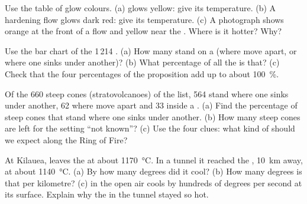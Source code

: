 \begin{exercise}[$\star$]\label{exo:g7:volcanoes:4}
Use the table of glow colours. (a)  glows yellow: give its
temperature. (b) A hardening flow glows dark red: give its temperature.
(c) A photograph shows orange  at the front of a flow and yellow 
near the . Where is it hotter? Why?
\end{exercise}

\begin{exercise}[$\star\star$]\label{exo:g7:volcanoes:5}
Use the bar chart of the 1\,214 . (a) How many  stand on
a  (where  move apart, or where one sinks under
another)? (b) What percentage of all the  is that? (c) Check that
the four percentages of the proposition add up to about 100~\%.
\end{exercise}

\begin{exercise}[$\star\star$]\label{exo:g7:volcanoes:6}
Of the 660 steep cones (stratovolcanoes) of the list, 564 stand where one
 sinks under another, 62 where  move apart and 33 inside a
. (a) Find the percentage of steep cones that stand where one 
sinks under another. (b) How many steep cones are left for the setting ``not
known''? (c) Use the four clues: what kind of  should we expect
along the Ring of Fire?
\end{exercise}

\begin{exercise}[$\star\star$]\label{exo:g7:volcanoes:7}
At Kilauea,  leaves the  at about \qty{1170}{\degreeCelsius}. In a
 tunnel it reached the , \qty{10}{km} away, at about
\qty{1140}{\degreeCelsius}. (a) By how many degrees did it cool? (b) How
many degrees is that per kilometre? (c)  in the open air cools by
hundreds of degrees per second at its surface. Explain why the  in
the tunnel stayed so hot.
\end{exercise}

